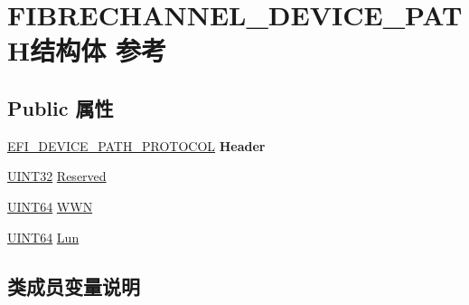 \hypertarget{struct_f_i_b_r_e_c_h_a_n_n_e_l___d_e_v_i_c_e___p_a_t_h}{}\section{F\+I\+B\+R\+E\+C\+H\+A\+N\+N\+E\+L\+\_\+\+D\+E\+V\+I\+C\+E\+\_\+\+P\+A\+T\+H结构体 参考}
\label{struct_f_i_b_r_e_c_h_a_n_n_e_l___d_e_v_i_c_e___p_a_t_h}
\subsection*{Public 属性}
\begin{DoxyCompactItemize}
\item 
\mbox{\label{struct_f_i_b_r_e_c_h_a_n_n_e_l___d_e_v_i_c_e___p_a_t_h_a6e7c21bfcd3fa98c53fbeecf7d05c360}} 
\hyperlink{struct_e_f_i___d_e_v_i_c_e___p_a_t_h___p_r_o_t_o_c_o_l}{E\+F\+I\+\_\+\+D\+E\+V\+I\+C\+E\+\_\+\+P\+A\+T\+H\+\_\+\+P\+R\+O\+T\+O\+C\+OL} {\bfseries Header}
\item 
\hyperlink{_processor_bind_8h_ae1e6edbbc26d6fbc71a90190d0266018}{U\+I\+N\+T32} \hyperlink{struct_f_i_b_r_e_c_h_a_n_n_e_l___d_e_v_i_c_e___p_a_t_h_aecab88e410b6a6cbc297b53dc7a9f76e}{Reserved}
\item 
\hyperlink{_processor_bind_8h_a57be03562867144161c1bfee95ca8f7c}{U\+I\+N\+T64} \hyperlink{struct_f_i_b_r_e_c_h_a_n_n_e_l___d_e_v_i_c_e___p_a_t_h_afa1e02f376bb8583bede6cc09aa9312c}{W\+WN}
\item 
\hyperlink{_processor_bind_8h_a57be03562867144161c1bfee95ca8f7c}{U\+I\+N\+T64} \hyperlink{struct_f_i_b_r_e_c_h_a_n_n_e_l___d_e_v_i_c_e___p_a_t_h_ab4f499f9379ef8cad8955ab37929ad53}{Lun}
\end{DoxyCompactItemize}


\subsection{类成员变量说明}
\mbox{\label{struct_f_i_b_r_e_c_h_a_n_n_e_l___d_e_v_i_c_e___p_a_t_h_ab4f499f9379ef8cad8955ab37929ad53}} 
